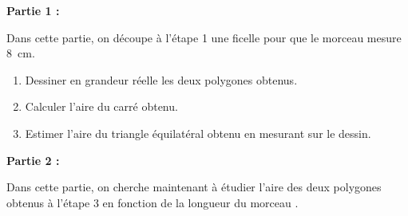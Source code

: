 \documentclass[10pt]{article}
\begin{document}
\textbf{Partie 1 :}

\smallskip 

Dans cette partie, on découpe à l'étape 1 une ficelle pour que le \og morceau  \fg{} mesure 8~cm.

\medskip 

\begin{enumerate}
\item Dessiner en grandeur réelle les deux polygones obtenus. 
\item Calculer l'aire du carré obtenu. 
\item Estimer l'aire du triangle équilatéral obtenu en mesurant sur le dessin. 
\end{enumerate}

\medskip

\textbf{Partie 2 :}

\medskip 

Dans cette partie, on cherche maintenant à étudier l'aire des deux polygones obtenus à l'étape 3 en fonction de la longueur du \og morceau  \fg. 

\medskip
\end{document}

